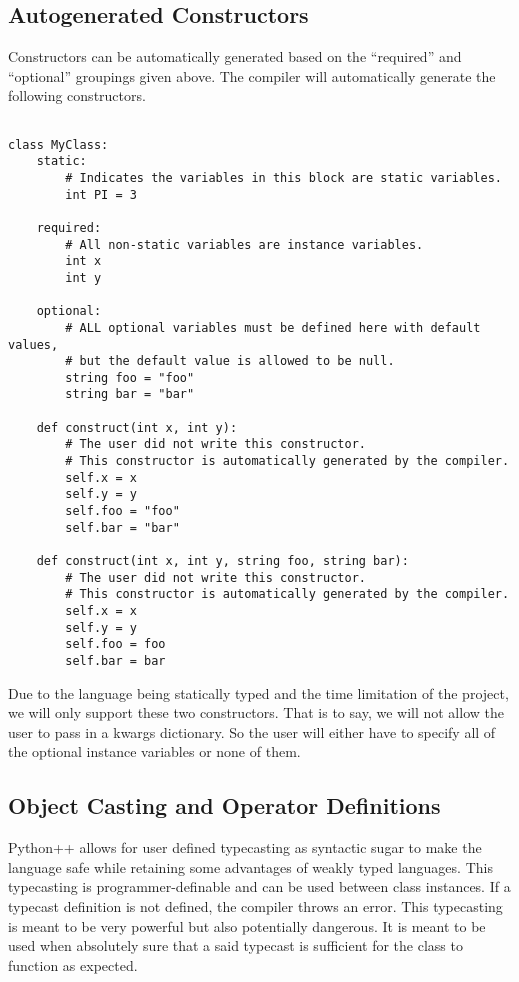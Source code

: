 \documentclass{article}
\begin{document}
\subsection{Autogenerated Constructors}
Constructors can be automatically generated based on the ``required'' and ``optional'' groupings given above. The compiler will automatically generate the following constructors.

\begin{verbatim}

class MyClass:
    static:
        # Indicates the variables in this block are static variables.
        int PI = 3
    
    required:
        # All non-static variables are instance variables.
        int x
        int y
    
    optional:
        # ALL optional variables must be defined here with default values,
        # but the default value is allowed to be null.
        string foo = "foo"
        string bar = "bar"
        
    def construct(int x, int y):
        # The user did not write this constructor.
        # This constructor is automatically generated by the compiler.
        self.x = x
        self.y = y
        self.foo = "foo"
        self.bar = "bar"
    
    def construct(int x, int y, string foo, string bar):
        # The user did not write this constructor.
        # This constructor is automatically generated by the compiler.
        self.x = x
        self.y = y
        self.foo = foo
        self.bar = bar
\end{verbatim}

\noindent Due to the language being statically typed and the time limitation of the project, we will only support these two constructors. That is to say, we will not allow the user to pass in a kwargs dictionary. So the user will either have to specify all of the optional instance variables or none of them.

\subsection{Object Casting and Operator Definitions}
Python++ allows for user defined typecasting as syntactic sugar to make the language safe while retaining some advantages of weakly typed languages. This typecasting is programmer-definable and can be used between class instances.  If a typecast definition is not defined, the compiler throws an error. This typecasting is meant to be very powerful but also potentially dangerous. It is meant to be used when absolutely sure that a said typecast is sufficient for the class to function as expected.  
\end{document}
